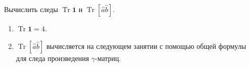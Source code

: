 \documentclass[../final.tex]{subfiles}
\begin{document}
\label{task:gamma_traces_sem8}

\condition
Вычислить следы $\operatorname{Tr}\mathbf 1$ и $\operatorname{Tr}[\hat a\hat b]$.

\solution
\begin{enumerate}[label=\arabic*)]
    \item $\operatorname{Tr}\mathbf 1=4$.
    \item $\operatorname{Tr}[\hat a\hat b]$ вычисляется на следующем занятии
    с помощью общей формулы для следа произведения $\gamma$-матриц.
\end{enumerate}
\end{document}
